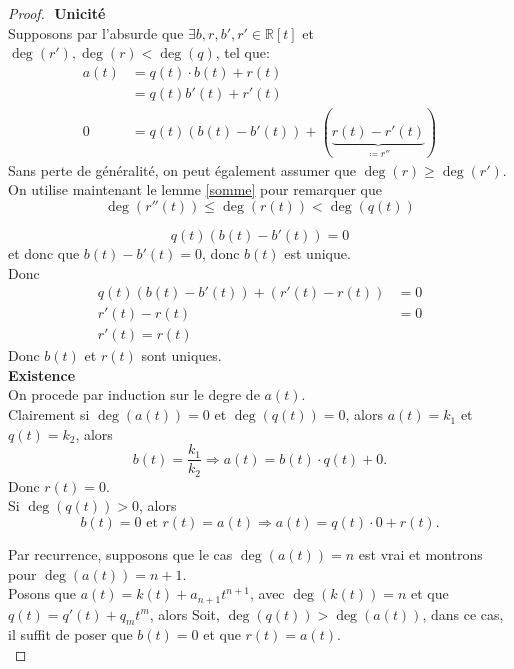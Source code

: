 \documentclass[11pt, a4paper, twoside]{article}
\begin{document}
\begin{proof}
$ $\newline
\textbf{Unicité}\\
Supposons par l'absurde que $\exists b,r,b',r' \in \mathbb{R}[t]$ et $\deg(r'),\deg(r) < \deg(q)$, tel que:
\begin{align*}
	a(t) &= q(t) \cdot b(t) + r(t)\\
	     &= q(t) b'(t) + r'(t)\\
	0 &= q(t)(b(t) - b'(t)) + (\underbrace{  r(t) - r'(t) }_{\coloneqq r''}) 
\end{align*}
Sans perte de généralité, on peut également assumer que $\deg(r) \geq \deg(r')$.\\
On utilise maintenant le lemme \ref{somme} pour remarquer que
\[ 
	\deg(r''(t)) \leq \deg(r(t)) < \deg(q(t))
\]

\[ 
	q(t)(b(t) - b'(t)) = 0
\]
et donc que $b(t) - b'(t) = 0$, donc $b(t)$ est unique.\\
Donc 
\begin{align*}
	q(t)(b(t) - b'(t)) + ( r'(t) - r(t)) &=0\\
	r'(t) - r(t) &= 0\\
	r'(t) = r(t)
\end{align*}
Donc $b(t)$ et $r(t)$ sont uniques.\\

\textbf{Existence}\\
On procede par induction sur le degre de $a(t)$.\\
Clairement si $\deg(a(t))=0$ et $\deg(q(t))=0$, alors $a(t) = k_1$ et $q(t) = k_2$, alors
\[ 
	b(t) = \frac{k_1}{k_2} \Rightarrow a(t) = b(t) \cdot q(t) + 0
.\]
Donc $r(t)=0$.\\
Si $\deg(q(t))> 0$, alors
\[ 
	b(t) = 0  \text{ et } r(t) = a(t) \Rightarrow  a(t) = q(t) \cdot 0 + r(t)
.\]

Par recurrence, supposons que le cas $\deg(a(t))=n$ est vrai et montrons pour $\deg(a(t))=n+1$.\\
Posons que $a(t)=k(t) + a_{n+1} t^{n+1}$, avec $\deg(k(t))=n$ et que $q(t) = q'(t) + q_m t^{m}$, alors
Soit, $\deg(q(t)) > \deg(a(t))$, dans ce cas, il suffit de poser que $b(t) = 0$ et que $r(t)= a(t)$.\\


\end{proof}
\end{document}
